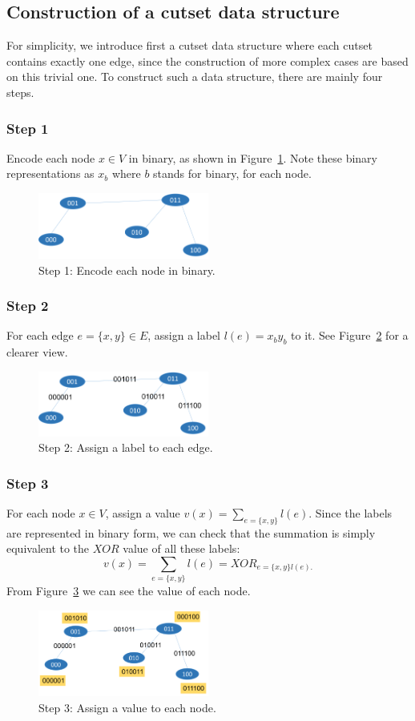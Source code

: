 \documentclass[conference,compsoc]{IEEEtran}
\begin{document}
\subsection{Construction of a cutset data structure}
For simplicity, we introduce first a cutset data structure where each cutset contains exactly one edge, since the construction of more complex cases are based on this trivial one. To construct such a data structure, there are mainly four steps.
\subsubsection*{Step 1} Encode each node $x \in V$ in binary, as shown in  Figure~\ref{fig:1}. Note these binary representations as $x_b$ where $b$ stands for binary, for each node.
\begin{figure}[h]
	\centering
	\includegraphics[width=0.5\textwidth]{Pic/1.png}
	\caption{Step 1: Encode each node in binary.}
	\label{fig:1}
\end{figure}
\subsubsection*{Step 2} For each edge $e=\{x,y\}\in E$, assign a label $l(e)=x_by_b$ to it. See Figure~\ref{fig:2} for a clearer view.
\begin{figure}[h]
	\centering
	\includegraphics[width=0.5\textwidth]{Pic/2.png}
	\caption{Step 2: Assign a label to each edge.}
	\label{fig:2}
\end{figure}
\subsubsection*{Step 3} For each node $x \in V$, assign a value $v(x)=\sum_{e=\{x,y\}}l(e).$ Since the labels are represented in binary form, we can check that the summation is simply equivalent to the $XOR$ value of all these labels:
\begin{equation}
v(x)=\sum_{e=\{x,y\}}l(e)=XOR_{e=\{x,y\}l(e).}
\end{equation}
From Figure~\ref{fig:3} we can see the value of each node.
\begin{figure}[h]
	\centering
	\includegraphics[width=0.5\textwidth]{Pic/3.png}
	\caption{Step 3: Assign a value to each node.}
	\label{fig:3}
\end{figure}
\end{document}
